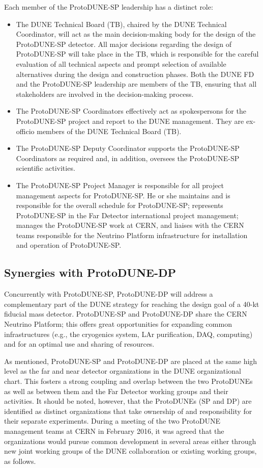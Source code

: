 Each member of the ProtoDUNE-SP leadership has a distinct role:
\begin{itemize}
\item The DUNE Technical Board (TB), chaired by the DUNE Technical Coordinator, will act as the main decision-making body for the design of the ProtoDUNE-SP detector. All major decisions regarding the design of ProtoDUNE-SP will take place in the TB, which is responsible for the careful evaluation of all technical aspects and prompt selection of available alternatives during the design and construction phases. Both the DUNE FD and the ProtoDUNE-SP leadership are members of the TB, ensuring that all stakeholders are involved in the decision-making process.
\item The ProtoDUNE-SP Coordinators effectively act as spokespersons for the ProtoDUNE-SP project and report to the DUNE management. They are ex-officio members of the DUNE Technical Board (TB).
\item The ProtoDUNE-SP Deputy Coordinator supports the ProtoDUNE-SP Coordinators as required and, in addition, oversees the ProtoDUNE-SP scientific activities. 
\item The ProtoDUNE-SP Project Manager is responsible for all project management aspects for ProtoDUNE-SP. He or she maintains and is responsible for the overall schedule for ProtoDUNE-SP; represents ProtoDUNE-SP in the Far Detector international project management; manages the ProtoDUNE-SP work at CERN, and liaises with the CERN teams responsible for the Neutrino Platform infrastructure for installation and operation of ProtoDUNE-SP.
\end{itemize}

\subsection{Synergies with ProtoDUNE-DP}

Concurrently with ProtoDUNE-SP, ProtoDUNE-DP will address a complementary part of the DUNE strategy for reaching the design goal of a 40-kt fiducial mass detector. ProtoDUNE-SP and ProtoDUNE-DP share the CERN Neutrino Platform; this offers great opportunities for expanding common infrastructures (e.g., the cryogenics system, LAr purification, DAQ, computing) and for an optimal use and sharing of resources.

As mentioned, ProtoDUNE-SP and ProtoDUNE-DP are placed at the same high level as the far and near detector organizations in the DUNE organizational chart. This fosters a strong coupling and overlap between the two ProtoDUNEs as well as between them and the Far Detector working groups and their activities. It should be noted, however, that the ProtoDUNEs (SP and DP) are identified as distinct organizations that take ownership of and responsibility for their separate experiments.
During a meeting of the two ProtoDUNE management teams at CERN in February 2016, it was agreed that the organizations would pursue common development in several areas either through new joint working groups of the DUNE collaboration or existing working groups, as follows. 


